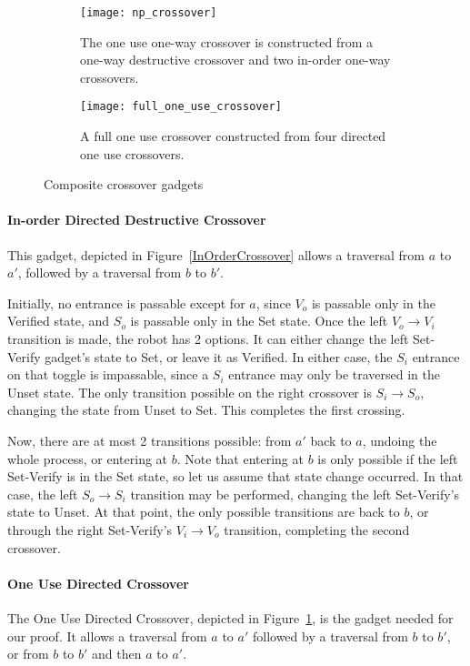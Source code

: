 \begin{figure}[!ht]
  \centering
  \begin{subfigure}[b]{0.48\textwidth}
    \texttt{[image: np\_crossover]}
    \caption{The one use one-way crossover is constructed from a one-way destructive crossover and two in-order one-way crossovers.}
    \label{OneUseCrossover}
  \end{subfigure}
  \hfill
  \begin{subfigure}[b]{0.43\textwidth}
    \texttt{[image: full\_one\_use\_crossover]}
    \caption{A full one use crossover constructed from four directed one use crossovers.}
    \label{full_one_use_crossover}
  \end{subfigure}
  \caption{Composite crossover gadgets}
\end{figure}

\paragraph{In-order Directed Destructive Crossover} This gadget, depicted in Figure~\ref{InOrderCrossover} allows a traversal from $a$ to $a'$, followed by a traversal from $b$ to $b'$.

Initially, no entrance is passable except for $a$, since $V_o$ is passable only in the Verified state, and $S_o$ is
passable only in the Set state. Once the left $V_o \rightarrow V_i$ transition is made, the robot has 2 options.
It can either change the left Set-Verify gadget's state to Set, or leave it as Verified. In either case, the $S_i$
entrance on that toggle is impassable, since a $S_i$ entrance may only be traversed in the Unset state. The
only transition possible on the right crossover is $S_i \rightarrow S_o$, changing the state from Unset to Set.
This completes the first crossing.

Now, there are at most 2 transitions possible: from $a'$ back to $a$, undoing the whole process, or entering at $b$. Note that entering at $b$ is only possible if the left Set-Verify is in the Set state, so let us assume that state change occurred. In that case, the left $S_o \rightarrow S_i$ transition may be performed, changing the left Set-Verify's state to Unset. At that point, the only possible transitions are back to $b$, or through the right Set-Verify's
$V_i \rightarrow V_o$ transition, completing the second crossover.


\paragraph{One Use Directed Crossover} 
The One Use Directed Crossover, depicted in Figure~\ref{OneUseCrossover}, is the gadget needed for our proof. It allows a traversal from $a$ to $a'$ followed by a traversal from $b$ to $b'$, or from $b$ to $b'$ and then $a$ to $a'$.

